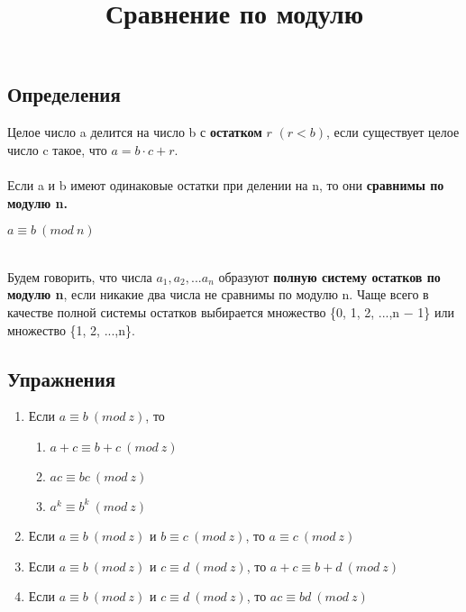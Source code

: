 \documentclass[a4paper,12pt]{article}
\title{Сравнение по модулю}
\begin{document}
\maketitle
    \subsection*{Определения} Целое число a делится на число b с \textbf{остатком} $r$ $(r < b)$, если существует целое число c такое, что $a = b \cdot c + r$. \\ \\
    Если a и b имеют одинаковые остатки при делении на n, то они \textbf{сравнимы по модулю n.} \\
    \begin{center}
        $a \equiv b \ (mod \ n)$
    \end{center} \\
    Будем говорить, что числа $a_1, a_2, . . . a_n$ образуют \textbf{полную систему остатков по модулю n}, если никакие два числа не сравнимы по модулю
    n. Чаще всего в качестве полной системы остатков выбирается множество
    \{0, 1, 2, ...,n − 1\} или множество \{1, 2, ...,n\}.
    \subsection*{Упражнения} 
    \begin{enumerate}
        \item Если $a \equiv b \ (mod \ z)$, то
        \begin{enumerate}
            \item $a + c \equiv b + c \ (mod \ z)$
            \item $ac \equiv bc \ (mod \ z)$
            \item $a^k \equiv b^k \ (mod \ z)$
        \end{enumerate}
        \item Если $a \equiv b \ (mod \ z)$ и $b \equiv c \ (mod \ z)$, то  $a \equiv c \ (mod \ z)$
        \item Если $a \equiv b \ (mod \ z)$ и $c \equiv d \ (mod \ z)$, то  $a + c \equiv b + d \ (mod \ z)$
        \item Если $a \equiv b \ (mod \ z)$ и $c \equiv d \ (mod \ z)$, то  $ac \equiv bd \ (mod \ z)$
    \end{enumerate}
\end{document}
